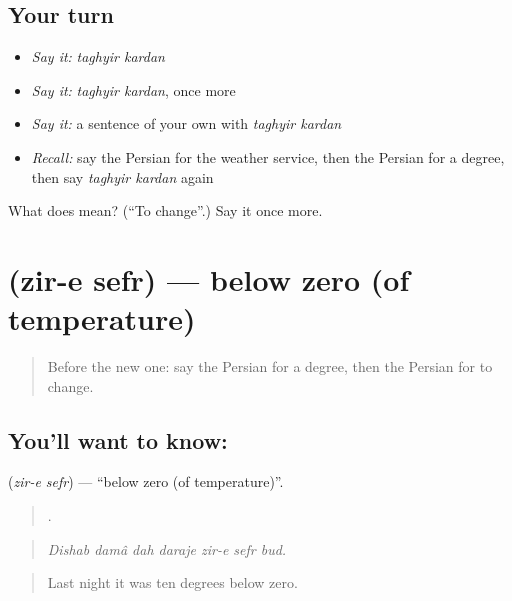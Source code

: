 \subsection*{Your turn}
\begin{itemize}
\raggedright
  \item \emph{Say it:} \emph{taghyir kardan}
  \item \emph{Say it:} \emph{taghyir kardan}, once more
  \item \emph{Say it:} a sentence of your own with \emph{taghyir kardan}
  \item \emph{Recall:} say the Persian for the weather service, then the Persian for a degree, then say \emph{taghyir kardan} again
\end{itemize}

\begin{tcolorbox}[breakable,colback=teal!4,colframe=teal!35!black,title={Before you move on}]
What does   mean? (\textquotedblleft{}To change\textquotedblright{}.) Say it once more.
\end{tcolorbox}
\section[\texorpdfstring{\fa{زیر} \fa{صفر} (zir-e sefr)}{زیر صفر (zir-e sefr)}]{  (zir-e sefr) — below zero (of temperature)}

\label{lesson:FA-C473-zir-e-sefr}



\begin{quote}
Before the new one: say the Persian for a degree, then the Persian for to change.
\end{quote}

\subsection*{You'll want to know:  }
\textbf{ } (\emph{zir-e sefr}) — \textquotedblleft{}below zero (of temperature)\textquotedblright{}.

\begin{quote}
      .
\end{quote}

\begin{quote}
\emph{Dishab damâ dah daraje zir-e sefr bud.}
\end{quote}

\begin{quote}
Last night it was ten degrees below zero.
\end{quote}

